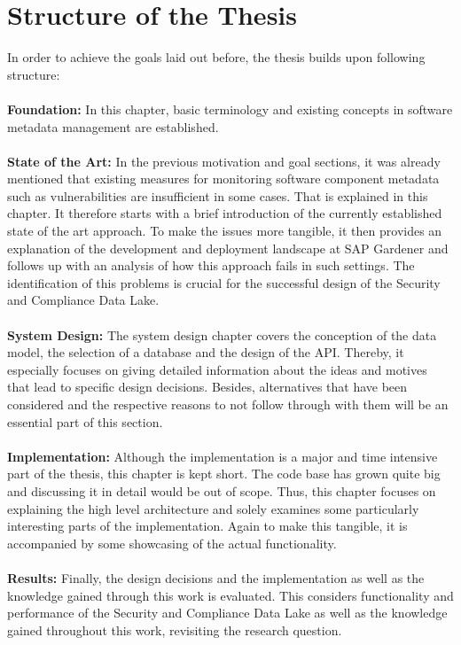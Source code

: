 \section{Structure of the Thesis}
In order to achieve the goals laid out before, the thesis builds upon following structure:\\\\
\textbf{Foundation:} In this chapter, basic terminology and existing concepts in software metadata management are established.\\\\
\textbf{State of the Art:} In the previous motivation and goal sections, it was already mentioned that existing measures for monitoring software component metadata such as vulnerabilities are insufficient in some cases. That is explained in this chapter. It therefore starts with a brief introduction of the currently established state of the art approach. To make the issues more tangible, it then provides an explanation of the development and deployment landscape at SAP Gardener and follows up with an analysis of how this approach fails in such settings. The identification of this problems is crucial for the successful design of the Security and Compliance Data Lake.\\\\
\textbf{System Design:} The system design chapter covers the conception of the data model, the selection of a database and the design of the API. Thereby, it especially focuses on giving detailed information about the ideas and motives that lead to specific design decisions. Besides, alternatives that have been considered and the respective reasons to not follow through with them will be an essential part of this section.\\\\
\textbf{Implementation:} Although the implementation is a major and time intensive part of the thesis, this chapter is kept short. The code base has grown quite big and discussing it in detail would be out of scope. Thus, this chapter focuses on explaining the high level architecture and solely examines some particularly interesting parts of the implementation. Again to make this tangible, it is accompanied by some showcasing of  the actual functionality.\\\\
\textbf{Results:} Finally, the design decisions and the implementation as well as the knowledge gained through this work is evaluated. This considers functionality and performance of the Security and Compliance Data Lake as well as the knowledge gained throughout this work, revisiting the research question.


